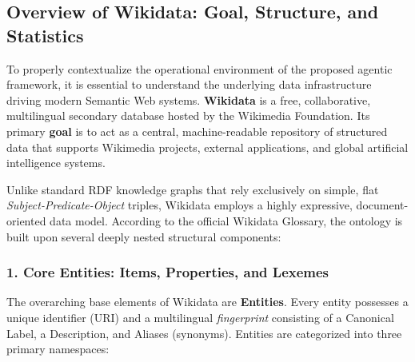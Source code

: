 \subsection{Overview of Wikidata: Goal, Structure, and Statistics}
\label{sec:wikidata_overview}

To properly contextualize the operational environment of the proposed agentic framework, it is essential to understand the underlying data infrastructure driving modern Semantic Web systems. \textbf{Wikidata} is a free, collaborative, multilingual secondary database hosted by the Wikimedia Foundation. Its primary \textbf{goal} is to act as a central, machine-readable repository of structured data that supports Wikimedia projects, external applications, and global artificial intelligence systems.

Unlike standard RDF knowledge graphs that rely exclusively on simple, flat \textit{Subject-Predicate-Object} triples, Wikidata employs a highly expressive, document-oriented data model. According to the official Wikidata Glossary, the ontology is built upon several deeply nested structural components:

\subsubsection*{1. Core Entities: Items, Properties, and Lexemes}
The overarching base elements of Wikidata are \textbf{Entities}. Every entity possesses a unique identifier (URI) and a multilingual \textit{fingerprint} consisting of a Canonical Label, a Description, and Aliases (synonyms). Entities are categorized into three primary namespaces:

